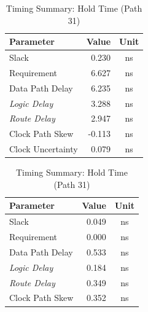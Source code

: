 \documentclass[11pt]{article}
\begin{document}
\begin{table}[H]
    \centering 
    \begin{minipage}[b]{0.48\textwidth}
        \flushleft
        \captionsetup{type=table, singlelinecheck=false, justification=raggedright, skip=2pt}
        \caption{Timing Summary: Setup Time (Path 21)}
        \label{tab:setup_report}
        \small
        \begin{tabular}{lrc}
            \toprule
            \textbf{Parameter} & \textbf{Value} & \textbf{Unit} \\
            \midrule
            Slack             & 0.230 & ns \\
            Requirement       & 6.627 & ns \\
            Data Path Delay   & 6.235 & ns \\
            \quad \textit{Logic Delay} & 3.288 & ns \\
            \quad \textit{Route Delay} & 2.947 & ns \\
            Clock Path Skew   & -0.113 & ns \\
            Clock Uncertainty & 0.079 & ns \\
            \bottomrule
        \end{tabular}
    \end{minipage}%
    \hfill 
    \begin{minipage}[b]{0.48\textwidth}
        \flushleft
        \captionsetup{type=table, singlelinecheck=false, justification=raggedright, skip=2pt}
        \caption{Timing Summary: Hold Time (Path 31)}
        \label{tab:hold_report}
        \small
        \begin{tabular}{lrc}
            \toprule
            \textbf{Parameter} & \textbf{Value} & \textbf{Unit} \\
            \midrule
            Slack             & 0.049 & ns \\
            Requirement       & 0.000 & ns \\
            Data Path Delay   & 0.533 & ns \\
            \quad \textit{Logic Delay} & 0.184 & ns \\
            \quad \textit{Route Delay} & 0.349 & ns \\
            Clock Path Skew   & 0.352 & ns \\
            \bottomrule
        \end{tabular}
    \end{minipage}
    
\end{table}
\end{document}
